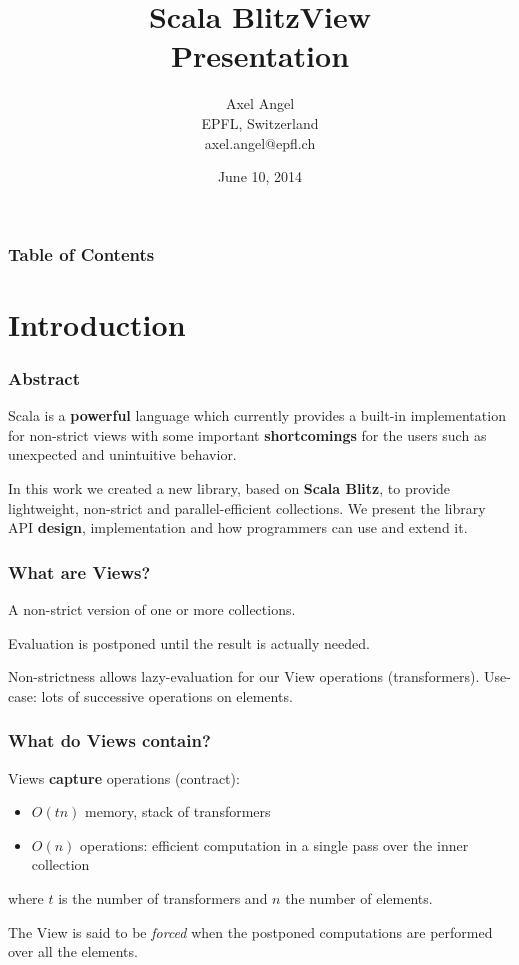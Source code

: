 \documentclass[12pt]{beamer}
\title{Scala BlitzView \\Presentation}
\author{Axel Angel \\EPFL, Switzerland \\axel.angel@epfl.ch}
\date{June 10, 2014}
\begin{document}
\begin{frame}
    \maketitle
\end{frame}

\begin{frame}
    \frametitle{Table of Contents}
    \tableofcontents
\end{frame}

\section{Introduction}
\begin{frame}
    \frametitle{Abstract}
    Scala is a {\bf powerful} language which currently provides a built-in implementation for non-strict views with some important {\bf shortcomings} for the users such as unexpected and unintuitive behavior.

    In this work we created a new library, based on {\bf Scala Blitz}, to provide lightweight, non-strict and parallel-efficient collections.
    We present the library API {\bf design}, implementation and how programmers can use and extend it.
\end{frame}

\begin{frame}
    \frametitle{What are Views?}
    \begin{definition}[View]
        A non-strict version of one or more collections.
    \end{definition}

    \begin{definition}
         Evaluation is postponed until the result is actually needed.
    \end{definition}
    Non-strictness allows lazy-evaluation for our View operations (transformers).
    Use-case: lots of successive operations on elements.
\end{frame}

\begin{frame}
    \frametitle{What do Views contain?}
    Views {\bf capture} operations (contract):
    \begin{itemize}
        \item $O(tn)$ memory, stack of transformers
        \item $O(n)$ operations: efficient computation in a single pass over the inner collection
    \end{itemize}
    where $t$ is the number of transformers and $n$ the number of elements.

    \begin{definition}
        The View is said to be {\it forced} when the postponed computations are performed over all the elements.
    \end{definition}
\end{frame}
\end{document}
